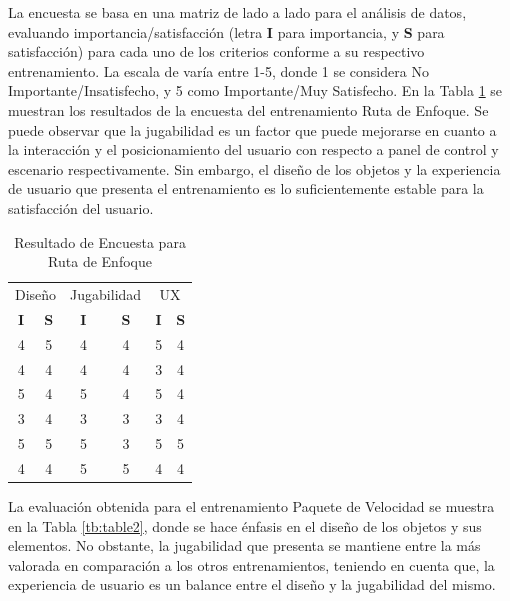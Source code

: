\documentclass[conference]{IEEEtran}
\begin{document}
La encuesta se basa en una matriz de lado a lado para el análisis de datos, evaluando importancia/satisfacción (letra \textbf{I} para importancia, y \textbf{S} para satisfacción) para cada uno de los criterios conforme a su respectivo entrenamiento. La escala de varía entre 1-5, donde 1 se considera No Importante/Insatisfecho, y 5 como Importante/Muy Satisfecho. En la Tabla \ref{tb:table1} se muestran los resultados de la encuesta del entrenamiento Ruta de Enfoque. Se puede observar que la jugabilidad es un factor que puede mejorarse en cuanto a la interacción y el posicionamiento del usuario con respecto a panel de control y escenario respectivamente. Sin embargo, el diseño de los objetos y la experiencia de usuario que presenta el entrenamiento es lo suficientemente estable para la satisfacción del usuario.

\begin{table}[htpb!]
\centering
\caption{Resultado de Encuesta para Ruta de Enfoque}
\label{tb:table1}
\begin{tabular}{@{}cc|cc|cc@{}}
\toprule
\multicolumn{2}{c}{Diseño} & \multicolumn{2}{c}{Jugabilidad} & \multicolumn{2}{c}{UX}  \\
\textbf{I}   & \textbf{S}  & \textbf{I}     & \textbf{S}     & \textbf{I} & \textbf{S} \\
4            & 5           & 4              & 4              & 5          & 4          \\
4            & 4           & 4              & 4              & 3          & 4          \\
5            & 4           & 5              & 4              & 5          & 4          \\
3            & 4           & 3              & 3              & 3          & 4          \\
5            & 5           & 5              & 3              & 5          & 5          \\
4            & 4           & 5              & 5              & 4          & 4          \\ \bottomrule
\end{tabular}
\end{table}

La evaluación obtenida para el entrenamiento Paquete de Velocidad se muestra en la Tabla \ref{tb:table2}, donde se hace énfasis en el diseño de los objetos y sus elementos. No obstante, la jugabilidad que presenta se mantiene entre la más valorada en comparación a los otros entrenamientos, teniendo en cuenta que, la experiencia de usuario es un balance entre el diseño y la jugabilidad del mismo.
\end{document}
